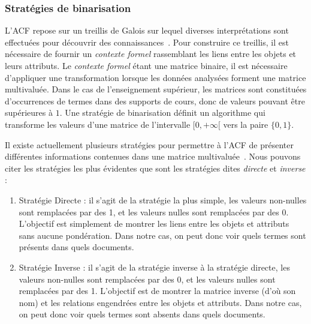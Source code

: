 \bigskip

\subsubsection{Stratégies de binarisation}
\label{subsubsection:Contexte:ACF-StrategiesBinarisation}

L'ACF repose sur un treillis de Galois sur lequel diverses interprétations sont effectuées pour découvrir des connaissances~\cite{jaffal2019aide}.
Pour construire ce treillis, il est nécessaire de fournir un \textit{contexte formel} rassemblant les liens entre les objets et leurs attributs.
Le \textit{contexte formel} étant une matrice binaire, il est nécessaire d'appliquer une transformation lorsque les données analysées forment une matrice multivaluée.
Dans le cas de l'enseignement supérieur, les matrices sont constituées d'occurrences de termes dans des supports de cours, donc de valeurs pouvant être supérieures à $ 1 $.
Une stratégie de binarisation définit un algorithme qui transforme les valeurs d'une matrice de l'intervalle $ [0, +\infty [ $ vers la paire $ \{ 0, 1 \} $.

\bigskip

Il existe actuellement plusieurs stratégies pour permettre à l'ACF de présenter différentes informations contenues dans une matrice multivaluée~\cite{jaffal2015refinement}\cite{jaffal2019aide}.
Nous pouvons citer les stratégies les plus évidentes que sont les stratégies dites \textit{directe} et \textit{inverse} :

\begin{enumerate}
\item Stratégie Directe : il s'agit de la stratégie la plus simple, les valeurs non-nulles sont remplacées par des 1, et les valeurs nulles sont remplacées par des 0.
L'objectif est simplement de montrer les liens entre les objets et attributs sans aucune pondération.
Dans notre cas, on peut donc voir quels termes sont présents dans quels documents.\\

\item Stratégie Inverse : il s'agit de la stratégie inverse à la stratégie directe, les valeurs non-nulles sont remplacées par des 0, et les valeurs nulles sont remplacées par des 1.
L'objectif est de montrer la matrice inverse (d'où son nom) et les relations engendrées entre les objets et attributs.
Dans notre cas, on peut donc voir quels termes sont absents dans quels documents.
\end{enumerate}

